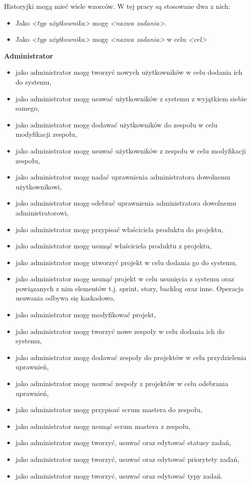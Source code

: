 Historyjki mogą mieć wiele wzorców. W tej pracy są stosowane dwa z nich:
\begin{itemize}
	\item Jako \textit{\textless typ użytkownika\textgreater} mogę \textit{\textless nazwa zadania\textgreater}.
	\item Jako \textit{\textless typ użytkownika\textgreater} mogę \textit{\textless nazwa zadania\textgreater} w celu \textit{\textless cel\textgreater}\cite{SCRUM}
\end{itemize} 


\textbf{Administrator}
\begin{itemize}	
	\item jako administrator mogę tworzyć nowych użytkowników w celu dodania ich do systemu,
	\item jako administrator mogę usuwać użytkowników z systemu z wyjątkiem siebie samego,
	\item jako administrator mogę dodawać użytkowników do zespołu w celu modyfikacji zespołu,
	\item jako administrator mogę usuwać użytkowników z zespołu w celu modyfikacji zespołu,
	\item jako administrator mogę nadać uprawnienia administratora dowolnemu użytkownikowi,
	\item jako administrator mogę odebrać uprawnienia administratora dowolnemu administratorowi,
	\item jako administrator mogę przypisać właściciela produktu do projektu,
	\item jako administrator mogę usunąć właściciela produktu z projektu,
	\item jako administrator mogę utworzyć projekt w celu dodania go do systemu,
	\item jako administrator mogę usunąć projekt w celu usunięcia z systemu oraz powiązanych z nim elementów t.j. sprint, story, backlog oraz inne. Operacja usuwania odbywa się kaskadowo,
	\item jako administrator mogę modyfikować projekt,
	\item jako administrator mogę tworzyć nowe zespoły w celu dodania ich do systemu,
	\item jako administrator mogę dodawać zespoły do projektów w celu przydzielenia uprawnień,
	\item jako administrator mogę usuwać zespoły z projektów w celu odebrania uprawnień,
	\item jako administrator mogę przypisać scrum mastera do zespołu,
	\item jako administrator mogę usunąć scrum mastera z zespołu,
	\item jako administrator mogę tworzyć, usuwać oraz edytować statusy zadań,
	\item jako administrator mogę tworzyć, usuwać oraz edytować priorytety zadań,
	\item jako administrator mogę tworzyć, usuwać oraz edytować typy zadań.
\end{itemize}		
